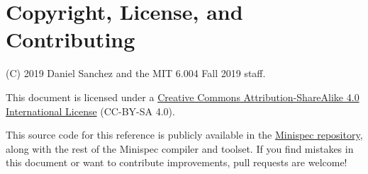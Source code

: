 \section{Copyright, License, and Contributing}

(C) 2019 Daniel Sanchez and the MIT 6.004 Fall 2019 staff.

This document is licensed under a \href{http://creativecommons.org/licenses/by-sa/4.0/}{Creative Commons Attribution-ShareAlike 4.0 International License} (CC-BY-SA 4.0).

This source code for this reference is publicly available in the \href{https://github.mit.edu/6004/minispec/}{Minispec repository},
along with the rest of the Minispec compiler and toolset.
If you find mistakes in this document or want to contribute improvements, pull requests are welcome!

